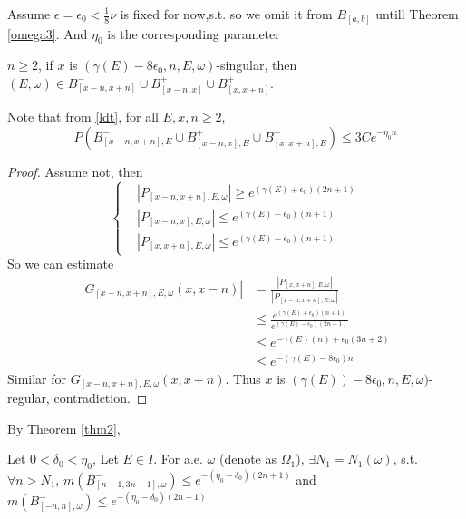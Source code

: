 Assume $\epsilon=\epsilon_0<\frac{1}{8}\nu$ is fixed for now,s.t. so we omit it from $B_{[a,b]}$ untill Theorem \ref{omega3}. And $\eta_0$ is the corresponding parameter
\begin{lemma}\label{lemma1}
 $n \geq 2$, if $x$ is $(\gamma(E)-8\epsilon_0,n,E,\omega)$-singular, then $(E,\omega)\in B_{[x-n,x+n]}^-\cup B_{[x-n,x]}^+\cup B_{[x,x+n]}^+$.
\end{lemma}
\begin{remark}
  Note that from \eqref{ldt}, for all $E,x,n\geq 2$,
  \[
    P(B_{[x-n,x+n],E}^-\cup B_{[x-n,x],E}^+\cup B_{[x,x+n],E}^+)\leq 3Ce^{-\eta_0 n}
  \]
\end{remark}
\begin{proof}
Assume not, then
\[
  \left\{
  \begin{aligned}
     & |P_{[x-n,x+n],E,\omega}|\geq e^{(\gamma(E)+\epsilon_0)(2n+1)} \\
     & |P_{[x-n,x],E,\omega}|\leq e^{(\gamma(E)-\epsilon_0)(n+1)} \\
     & |P_{[x,x+n],E,\omega}|\leq e^{(\gamma(E)-\epsilon_0)(n+1)}
  \end{aligned}
  \right.
\]
So we can estimate
\[
  \begin{aligned}
    \left\vert G_{[x-n,x+n],E,\omega}(x,x-n)\right\vert
    &=  \frac{\left\vert P_{[x,x+n],E,\omega}\right\vert}{\left\vert P_{[x-n,x+n],E,\omega}\right\vert}\\
    &\leq  \frac{e^{(\gamma(E)+\epsilon_0)(n+1)}}{e^{(\gamma(E)-\epsilon_0)(2n+1)}}\\
    &\leq  e^{-\gamma(E)(n)+\epsilon_0(3n+2)}\\
    &\leq  e^{-(\gamma(E)-8\epsilon_0)n}
  \end{aligned}
\]
Similar for $G_{[x-n,x+n],E,\omega}(x,x+n)$.
Thus $x$ is $(\gamma(E))-8\epsilon_0, n, E,\omega)$-regular, contradiction.
\end{proof}

By Theorem \ref{thm2},

\begin{thm}\label{omega1}
  Let $0<\delta_0<\eta_0$, Let $E\in I$. For a.e. $\omega$ (denote as $\Omega_1$), $\exists N_1=N_1(\omega)$, s.t. $\forall n>N_1$, $m(B_{[n+1,3n+1],\omega}^-)\leq e^{-(\eta_0-\delta_0)(2n+1)}$ and $m(B_{[-n,n],\omega}^-)\leq e^{-(\eta_0-\delta_0)(2n+1)}$
\end{thm}

